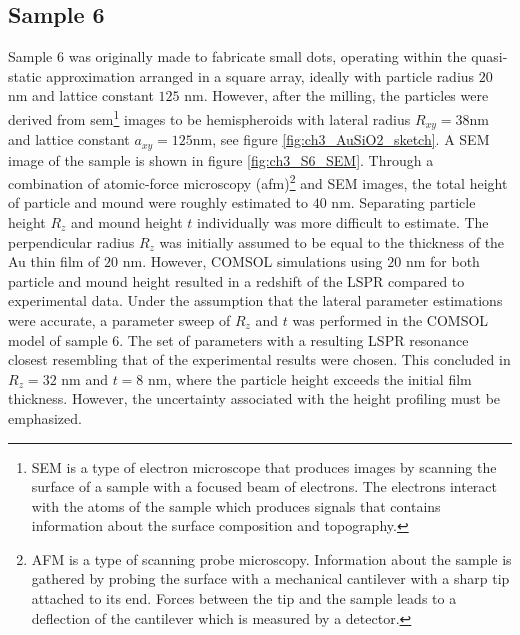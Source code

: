 \subsection{Sample 6}
Sample 6 was originally made to fabricate small dots, operating within the quasi-static approximation arranged in a square array, ideally with particle radius $20$ nm and lattice constant $125$ nm\cite{brakstad_thesis}. However, after the milling, the particles were derived from \ac{sem}\footnote{SEM is a type of electron microscope that produces images by scanning the surface of a sample with a focused beam of electrons. The electrons interact with the atoms of the sample which produces signals that contains information about the surface composition and topography.} images to be hemispheroids with lateral radius $R_{xy} = 38$nm and lattice constant $a_{xy} = 125$nm, see figure \ref{fig:ch3_AuSiO2_sketch}. A SEM image of the sample is shown in figure \ref{fig:ch3_S6_SEM}. Through a combination of atomic-force microscopy (\ac{afm})\footnote{AFM is a type of scanning probe microscopy. Information about the sample is gathered by probing the surface with a mechanical cantilever with a sharp tip attached to its end. Forces between the tip and the sample leads to a deflection of the cantilever which is measured by a detector\cite{afm_nanolab}.} and SEM images, the total height of particle and mound were roughly estimated to $40$ nm. Separating particle height $R_z$ and mound height $t$ individually was more difficult to estimate. The perpendicular radius $R_z$ was initially assumed to be equal to the thickness of the Au thin film of $20$ nm. However, COMSOL simulations using $20$ nm for both particle and mound height resulted in a redshift of the LSPR compared to experimental data. Under the assumption that the lateral parameter estimations were accurate, a parameter sweep of $R_z$ and $t$ was performed in the COMSOL model of sample 6. The set of parameters with a resulting LSPR resonance closest resembling that of the experimental results were chosen. This concluded in $R_z=32$ nm and $t=8$ nm, where the particle height exceeds the initial film thickness. However, the uncertainty associated with the height profiling must be emphasized.

